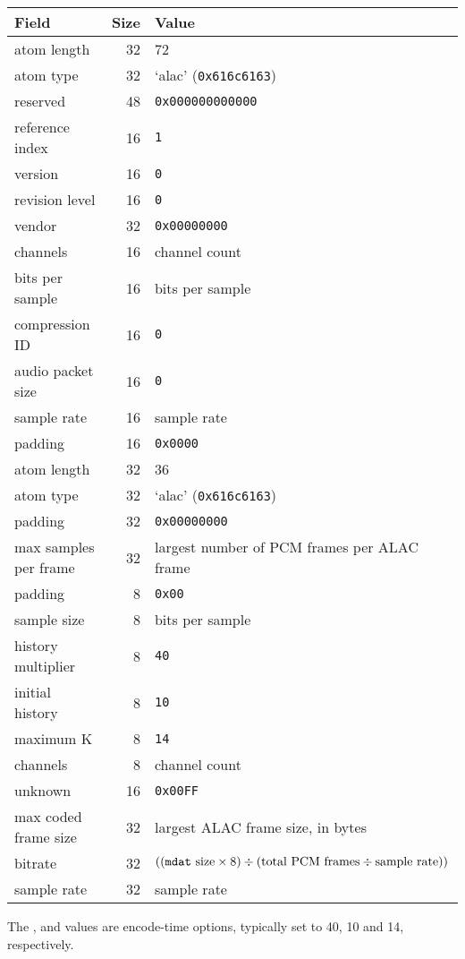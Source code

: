 \begin{table}[h]
\begin{tabular}{|l|r|l|}
\hline
Field & Size & Value \\
\hline
atom length & 32 & 72 \\
atom type & 32 & `alac' (\texttt{0x616c6163}) \\
\hline
reserved & 48 & \texttt{0x000000000000} \\
reference index & 16 & \texttt{1} \\
version & 16 & \texttt{0} \\
revision level & 16 & \texttt{0} \\
vendor & 32 & \texttt{0x00000000} \\
channels & 16 & channel count \\
bits per sample & 16 & bits per sample \\
compression ID & 16 & \texttt{0} \\
audio packet size & 16 & \texttt{0} \\
sample rate & 16 & sample rate \\
padding & 16 & \texttt{0x0000} \\
\hline
\hline
atom length & 32 & 36 \\
atom type & 32 & `alac' (\texttt{0x616c6163}) \\
\hline
padding & 32 & \texttt{0x00000000} \\
max samples per frame & 32 & largest number of PCM frames per ALAC frame \\
padding & 8 & \texttt{0x00} \\
sample size & 8 & bits per sample \\
history multiplier & 8 & \texttt{40} \\
initial history & 8 & \texttt{10} \\
maximum K & 8 & \texttt{14} \\
channels & 8 & channel count \\
unknown & 16 & \texttt{0x00FF} \\
max coded frame size & 32 & largest ALAC frame size, in bytes \\
bitrate & 32 & $((\text{\texttt{mdat} size} \times 8 ) \div (\text{total PCM frames} \div \text{sample rate}))$ \\
sample rate & 32 & sample rate \\
\hline
\end{tabular}
\end{table}
The ,  and 
values are encode-time options, typically set to 40, 10 and 14,
respectively.

